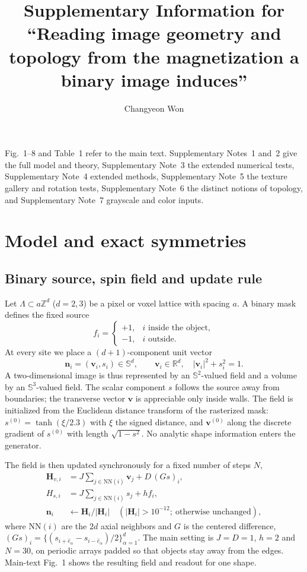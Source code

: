 \documentclass[11pt,a4paper]{article}
\title{Supplementary Information for\\ ``Reading image geometry and topology from the magnetization a binary image induces''}
\author{Changyeon Won}
\date{}
\newcommand{\nn}{\bm n}
\newcommand{\vv}{\bm v}
\newcommand{\Sn}{\mathbb S}
\begin{document}
\maketitle
\noindent Fig.~1--8 and Table~1 refer to the main text. Supplementary Notes~1 and~2 give the full model and theory, Supplementary Note~3 the extended numerical tests, Supplementary Note~4 extended methods, Supplementary Note~5 the texture gallery and rotation tests, Supplementary Note~6 the distinct notions of topology, and Supplementary Note~7 grayscale and color inputs.

\section{Model and exact symmetries}\label{sec:model}
\subsection{Binary source, spin field and update rule}
Let $\Lambda\subset a\mathbb Z^d$ ($d=2,3$) be a pixel or voxel lattice with spacing $a$. A binary mask defines the fixed source
\begin{equation}
 f_i=\begin{cases}+1,& i\text{ inside the object},\\ -1,& i\text{ outside}.\end{cases}
 \label{eq:binary}
\end{equation}
At every site we place a $(d+1)$-component unit vector
\begin{equation}
 \nn_i=(\vv_i,s_i)\in\Sn^d,\qquad \vv_i\in\mathbb R^d,\quad |\vv_i|^2+s_i^2=1 .
 \label{eq:spin}
\end{equation}
A two-dimensional image is thus represented by an $\Sn^2$-valued field and a volume by an $\Sn^3$-valued field. The scalar component $s$ follows the source away from boundaries; the transverse vector $\vv$ is appreciable only inside walls. The field is initialized from the Euclidean distance transform of the rasterized mask: $s^{(0)}=\tanh(\xi/2.3)$ with $\xi$ the signed distance, and $\vv^{(0)}$ along the discrete gradient of $s^{(0)}$ with length $\sqrt{1-s^2}$. No analytic shape information enters the generator.

The field is then updated synchronously for a fixed number of steps $N$,
\begin{align}
 \bm H_{v,i}&=J\!\!\sum_{j\in\mathrm{NN}(i)}\!\!\vv_j+D\,(Gs)_i,\label{eq:updatev}\\
 H_{s,i}&=J\!\!\sum_{j\in\mathrm{NN}(i)}\!\! s_j+h f_i,\label{eq:updates}\\
 \nn_i&\leftarrow\bm H_i/|\bm H_i|\quad(|\bm H_i|>10^{-12};\ \text{otherwise unchanged}),\label{eq:updaten}
\end{align}
where $\mathrm{NN}(i)$ are the $2d$ axial neighbors and $G$ is the centered difference, $(Gs)_i=\{(s_{i+\hat e_\alpha}-s_{i-\hat e_\alpha})/2\}_{\alpha=1}^d$. The main setting is $J=D=1$, $h=2$ and $N=30$, on periodic arrays padded so that objects stay away from the edges. Main-text Fig.~1 shows the resulting field and readout for one shape.
\end{document}
